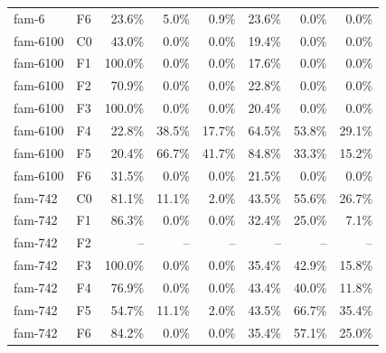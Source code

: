 \begin{tabular}{llrrrrrr}
fam-6 & F6 & 23.6\% & 5.0\% & 0.9\% & 23.6\% & 0.0\% & 0.0\% \\
fam-6100 & C0 & 43.0\% & 0.0\% & 0.0\% & 19.4\% & 0.0\% & 0.0\% \\
fam-6100 & F1 & 100.0\% & 0.0\% & 0.0\% & 17.6\% & 0.0\% & 0.0\% \\
fam-6100 & F2 & 70.9\% & 0.0\% & 0.0\% & 22.8\% & 0.0\% & 0.0\% \\
fam-6100 & F3 & 100.0\% & 0.0\% & 0.0\% & 20.4\% & 0.0\% & 0.0\% \\
fam-6100 & F4 & 22.8\% & 38.5\% & 17.7\% & 64.5\% & 53.8\% & 29.1\% \\
fam-6100 & F5 & 20.4\% & 66.7\% & 41.7\% & 84.8\% & 33.3\% & 15.2\% \\
fam-6100 & F6 & 31.5\% & 0.0\% & 0.0\% & 21.5\% & 0.0\% & 0.0\% \\
fam-742 & C0 & 81.1\% & 11.1\% & 2.0\% & 43.5\% & 55.6\% & 26.7\% \\
fam-742 & F1 & 86.3\% & 0.0\% & 0.0\% & 32.4\% & 25.0\% & 7.1\% \\
fam-742 & F2 & -- & -- & -- & -- & -- & -- \\
fam-742 & F3 & 100.0\% & 0.0\% & 0.0\% & 35.4\% & 42.9\% & 15.8\% \\
fam-742 & F4 & 76.9\% & 0.0\% & 0.0\% & 43.4\% & 40.0\% & 11.8\% \\
fam-742 & F5 & 54.7\% & 11.1\% & 2.0\% & 43.5\% & 66.7\% & 35.4\% \\
fam-742 & F6 & 84.2\% & 0.0\% & 0.0\% & 35.4\% & 57.1\% & 25.0\% \\
\bottomrule
\end{tabular}

